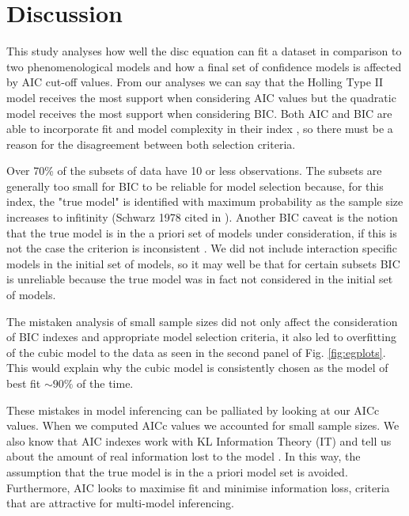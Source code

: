 \documentclass[11pt]{article}
\begin{document}
  \section{Discussion}
  
  This study analyses how well the disc equation can fit a dataset in comparison to two phenomenological models and how a final set of confidence models is affected by AIC cut-off values. From our analyses we can say that the Holling Type II model receives the most support when considering AIC values but the quadratic model receives the most support when considering BIC. Both AIC and BIC are able to incorporate fit and model complexity in their index \cite{JohnsonOmland2004}, so there must be a reason for the disagreement between both selection criteria.

  Over 70\% of the subsets of data have 10 or less observations. The subsets are generally too small for BIC to be reliable for model selection because, for this index, the "true model" is identified with maximum probability as the sample size increases to infitinity (Schwarz 1978 cited in \cite{Burnham2011}). Another BIC caveat is the notion that the true model is in the a priori set of models under consideration, if this is not the case the criterion is inconsistent \cite{Burnham2011}. We did not include interaction specific models in the initial set of models, so it may well be that for certain subsets BIC is unreliable because the true model was in fact not considered in the initial set of models.

  The mistaken analysis of small sample sizes did not only affect the consideration of BIC indexes and appropriate model selection criteria, it also led to overfitting of the cubic model to the data as seen in the second panel of Fig. \ref{fig:egplots}. This would explain why the cubic model is consistently chosen as the model of best fit $\sim90\%$ of the time.

  These mistakes in model inferencing can be palliated by looking at our AICc values. When we computed AICc values we accounted for small sample sizes. We also know that AIC indexes work with KL Information Theory (IT) and tell us about the amount of real information lost to the model \cite{JohnsonOmland2004}. In this way, the assumption that the true model is in the a priori model set is avoided. Furthermore, AIC looks to maximise fit and minimise information loss, criteria that are attractive for multi-model inferencing.
\end{document}
